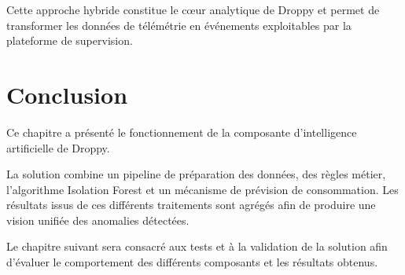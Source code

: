 Cette approche hybride constitue le cœur analytique de Droppy et permet de
transformer les données de télémétrie en événements exploitables par la
plateforme de supervision.



\section{Conclusion}

Ce chapitre a présenté le fonctionnement de la composante d'intelligence
artificielle de Droppy.

La solution combine un pipeline de préparation des données, des règles
métier, l'algorithme Isolation Forest et un mécanisme de prévision de
consommation. Les résultats issus de ces différents traitements sont
agrégés afin de produire une vision unifiée des anomalies détectées.

Le chapitre suivant sera consacré aux tests et à la validation de la solution
afin d'évaluer le comportement des différents composants et les résultats
obtenus.